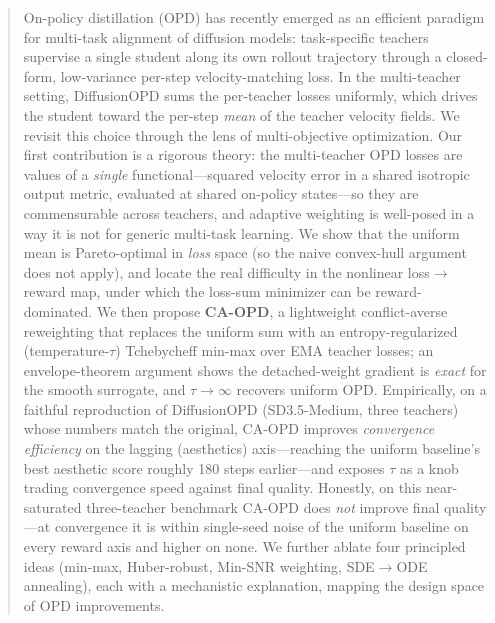 \begin{abstract}
On-policy distillation (OPD) has recently emerged as an efficient paradigm for
multi-task alignment of diffusion models: task-specific teachers supervise a
single student along its own rollout trajectory through a closed-form,
low-variance per-step velocity-matching loss. In the multi-teacher setting,
DiffusionOPD sums the per-teacher losses uniformly, which drives the student
toward the per-step \emph{mean} of the teacher velocity fields. We revisit this
choice through the lens of multi-objective optimization. Our first contribution
is a rigorous theory: the multi-teacher OPD losses are values of a \emph{single}
functional---squared velocity error in a shared isotropic output metric,
evaluated at shared on-policy states---so they are commensurable across teachers,
and adaptive weighting is well-posed in a way it is not for generic multi-task
learning. We show that the uniform mean is Pareto-optimal in \emph{loss} space
(so the naive convex-hull argument does not apply), and locate the real
difficulty in the nonlinear loss$\to$reward map, under which the loss-sum
minimizer can be reward-dominated. We then propose \textbf{CA-OPD}, a
lightweight conflict-averse reweighting that replaces the uniform sum with an
entropy-regularized (temperature-$\tau$) Tchebycheff min-max over EMA teacher
losses; an envelope-theorem argument shows the detached-weight gradient is
\emph{exact} for the smooth surrogate, and $\tau\to\infty$ recovers uniform OPD.
Empirically, on a faithful reproduction of DiffusionOPD (SD3.5-Medium, three
teachers) whose numbers match the original, CA-OPD improves \emph{convergence
efficiency} on the lagging (aesthetics) axis---reaching the uniform baseline's
best aesthetic score roughly 180 steps earlier---and exposes $\tau$ as a knob
trading convergence speed against final quality. Honestly, on this near-saturated
three-teacher benchmark CA-OPD does \emph{not} improve final quality---at
convergence it is within single-seed noise of the uniform baseline on every reward
axis and higher on none. We further ablate four
principled ideas (min-max, Huber-robust, Min-SNR weighting, SDE$\to$ODE
annealing), each with a mechanistic explanation, mapping the design space of OPD
improvements.
\end{abstract}

